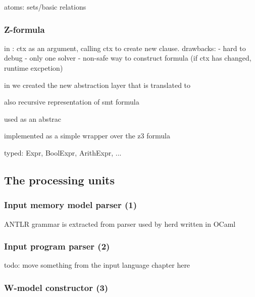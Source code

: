 atoms: sets/basic relations


\subsubsection{Z-formula}
\label{ch:impl:model:zformula}


in \porthos[1] : ctx as an argument, calling ctx to create new clause. 
drawbacks:
- hard to debug
- only one solver
- non-safe way to construct formula (if ctx has changed, runtime excpetion)

in \porthos[2] we created the new abstraction layer \zformula that is translated to 

also recursive representation of smt formula

used as an abstrac

implemented as a simple wrapper over the z3 formula

typed: Expr, BoolExpr, ArithExpr, ...



\subsection{The processing units} %
\label{ch:impl:proc}


\subsubsection{Input memory model parser (1)}
\label{ch:impl:proc:inp-mod-parser}

ANTLR grammar is extracted from parser used by herd written in OCaml

\subsubsection{Input program parser (2)}
\label{ch:impl:proc:inp-prog-parser}


todo: move something from the input language chapter here


\subsubsection{W-model constructor (3)}
\label{ch:impl:proc:w-constr}


